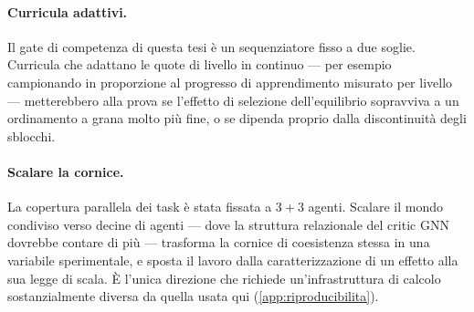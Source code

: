 \paragraph{Curricula adattivi.}
Il gate di competenza di questa tesi è un sequenziatore fisso a due
soglie. Curricula che adattano le quote di livello in continuo --- per
esempio campionando in proporzione al progresso di apprendimento
misurato per livello --- metterebbero alla prova se l'effetto di
selezione dell'equilibrio sopravviva a un ordinamento a grana molto più
fine, o se dipenda proprio dalla discontinuità degli sblocchi.

\paragraph{Scalare la cornice.}
La copertura parallela dei task è stata fissata a $3{+}3$ agenti.
Scalare il mondo condiviso verso decine di agenti --- dove la struttura
relazionale del critic GNN dovrebbe contare di più --- trasforma la
cornice di coesistenza stessa in una variabile sperimentale, e sposta il
lavoro dalla caratterizzazione di un effetto alla sua legge di scala. È
l'unica direzione che richiede un'infrastruttura di calcolo
sostanzialmente diversa da quella usata qui
(\cref{app:riproducibilita}).

